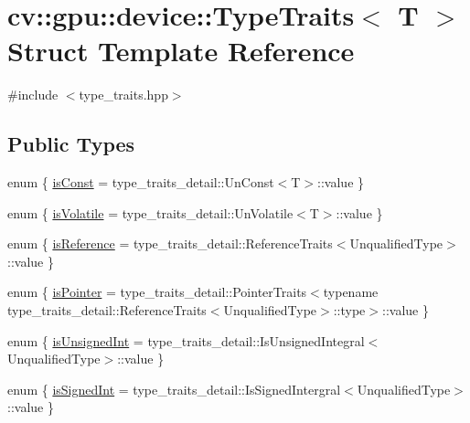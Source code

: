 \hypertarget{structcv_1_1gpu_1_1device_1_1TypeTraits}{\section{cv\-:\-:gpu\-:\-:device\-:\-:Type\-Traits$<$ T $>$ Struct Template Reference}
\label{structcv_1_1gpu_1_1device_1_1TypeTraits}
}


{\ttfamily \#include $<$type\-\_\-traits.\-hpp$>$}

\subsection*{Public Types}
\begin{DoxyCompactItemize}
\item 
enum \{ \hyperlink{structcv_1_1gpu_1_1device_1_1TypeTraits_a7e963477dc3be2323f037b99bdcd18caa73df44f7c1e815e7f4b9aa24df68a437}{is\-Const} = type\-\_\-traits\-\_\-detail\-:\-:Un\-Const$<$T$>$\-:\-:value
 \}
\item 
enum \{ \hyperlink{structcv_1_1gpu_1_1device_1_1TypeTraits_a11ee9d259d6bd5bcb2747aeb71129375ad561a4ec8e03c3870afd96f887d86905}{is\-Volatile} = type\-\_\-traits\-\_\-detail\-:\-:Un\-Volatile$<$T$>$\-:\-:value
 \}
\item 
enum \{ \hyperlink{structcv_1_1gpu_1_1device_1_1TypeTraits_add0f50eaac60defc7e9da5e62d693f81abd458d388c20965daae50bb8f32c450b}{is\-Reference} = type\-\_\-traits\-\_\-detail\-:\-:Reference\-Traits$<$Unqualified\-Type$>$\-:\-:value
 \}
\item 
enum \{ \hyperlink{structcv_1_1gpu_1_1device_1_1TypeTraits_ab2825627daf52f0bd9f7d70af80a6843aa0c646b9dc2b5cf236e1a113d6355017}{is\-Pointer} = type\-\_\-traits\-\_\-detail\-:\-:Pointer\-Traits$<$typename type\-\_\-traits\-\_\-detail\-:\-:Reference\-Traits$<$Unqualified\-Type$>$\-:\-:type$>$\-:\-:value
 \}
\item 
enum \{ \hyperlink{structcv_1_1gpu_1_1device_1_1TypeTraits_aafd47850bf29e6f5b30210d9b959f7d9a067a61f683fc8e6782f05cdc7b931249}{is\-Unsigned\-Int} = type\-\_\-traits\-\_\-detail\-:\-:Is\-Unsigned\-Integral$<$Unqualified\-Type$>$\-:\-:value
 \}
\item 
enum \{ \hyperlink{structcv_1_1gpu_1_1device_1_1TypeTraits_a886af89632b4ec2297a7c3508c89b6eba8e65c1a50ff62c47a7ce768ab7afa272}{is\-Signed\-Int} = type\-\_\-traits\-\_\-detail\-:\-:Is\-Signed\-Intergral$<$Unqualified\-Type$>$\-:\-:value
 \}
\item 

\end{DoxyCompactItemize}
